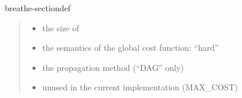 \documentclass[letterpaper,10pt,openany,oneside,english]{sphinxmanual}
\begin{document}
\begin{fulllineitems}
\begin{sphinxuseclass}{breathe-sectiondef}
\begin{fulllineitems}
\begin{quote}
\begin{description}
\begin{itemize}
\item {} 
\sphinxAtStartPar
{} \textendash{} the size of  

\item {} 
\sphinxAtStartPar
{} \textendash{} the semantics of the global cost function: “hard” 

\item {} 
\sphinxAtStartPar
{} \textendash{} the propagation method (“DAG” only) 

\item {} 
\sphinxAtStartPar
{} \textendash{} unused in the current implementation (MAX\_COST) 

\end{itemize}

\end{description}\end{quote}

\end{fulllineitems}



\end{sphinxuseclass}
\end{fulllineitems}
\end{document}
